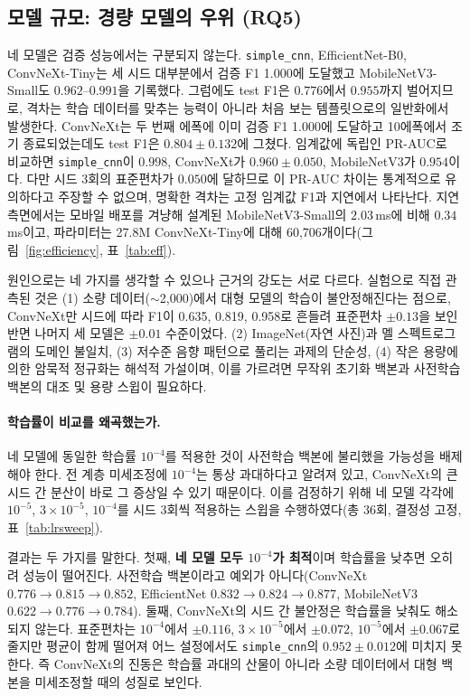 \documentclass[11pt]{article}
\renewcommand{\emph}[1]{\textbf{#1}}
\begin{document}
\subsection{모델 규모: 경량 모델의 우위 (RQ5)}
네 모델은 검증 성능에서는 구분되지 않는다. \texttt{simple\_cnn}, EfficientNet-B0,
ConvNeXt-Tiny는 세 시드 대부분에서 검증 F1 1.000에 도달했고 MobileNetV3-Small도
$0.962$--$0.991$을 기록했다. 그럼에도 test F1은 $0.776$에서 $0.955$까지 벌어지므로, 격차는
학습 데이터를 맞추는 능력이 아니라 처음 보는 템플릿으로의 일반화에서 발생한다. ConvNeXt는
두 번째 에폭에 이미 검증 F1 1.000에 도달하고 10에폭에서 조기 종료되었는데도 test F1은
$0.804\pm0.132$에 그쳤다. 임계값에 독립인 PR-AUC로 비교하면 \texttt{simple\_cnn}이 $0.998$,
ConvNeXt가 $0.960\pm0.050$, MobileNetV3가 $0.954$이다. 다만 시드 3회의 표준편차가 $0.050$에
달하므로 이 PR-AUC 차이는 통계적으로 유의하다고 주장할 수 없으며, 명확한 격차는 고정
임계값 F1과 지연에서 나타난다. 지연 측면에서는 모바일 배포를 겨냥해 설계된
MobileNetV3-Small의 $2.03$\,ms에 비해 $0.34$\,ms이고, 파라미터는 27.8M ConvNeXt-Tiny에 대해
60{,}706개이다(그림~\ref{fig:efficiency}, 표~\ref{tab:eff}).

원인으로는 네 가지를 생각할 수 있으나 근거의 강도는 서로 다르다. 실험으로 직접 관측된 것은
(1) 소량 데이터($\sim$2{,}000)에서 대형 모델의 학습이 불안정해진다는 점으로, ConvNeXt만 시드에
따라 F1이 0.635, 0.819, 0.958로 흔들려 표준편차 $\pm0.13$을 보인 반면 나머지 세 모델은
$\pm0.01$ 수준이었다. (2) ImageNet(자연 사진)과 멜 스펙트로그램의 도메인 불일치, (3) 저수준
음향 패턴으로 풀리는 과제의 단순성, (4) 작은 용량에 의한 암묵적 정규화는 해석적 가설이며,
이를 가르려면 무작위 초기화 백본과 사전학습 백본의 대조 및 용량 스윕이 필요하다.

\paragraph{학습률이 비교를 왜곡했는가.}
네 모델에 동일한 학습률 $10^{-4}$를 적용한 것이 사전학습 백본에 불리했을 가능성을 배제해야
한다. 전 계층 미세조정에 $10^{-4}$는 통상 과대하다고 알려져 있고, ConvNeXt의 큰 시드 간 분산이
바로 그 증상일 수 있기 때문이다. 이를 검정하기 위해 네 모델 각각에 $10^{-5}$, $3\times10^{-5}$,
$10^{-4}$를 시드 3회씩 적용하는 스윕을 수행하였다(총 36회, 결정성 고정, 표~\ref{tab:lrsweep}).

결과는 두 가지를 말한다. 첫째, \emph{네 모델 모두 $10^{-4}$가 최적}이며 학습률을 낮추면 오히려
성능이 떨어진다. 사전학습 백본이라고 예외가 아니다(ConvNeXt $0.776\to0.815\to0.852$,
EfficientNet $0.832\to0.824\to0.877$, MobileNetV3 $0.622\to0.776\to0.784$). 둘째, ConvNeXt의
시드 간 불안정은 학습률을 낮춰도 해소되지 않는다. 표준편차는 $10^{-4}$에서 $\pm0.116$,
$3\times10^{-5}$에서 $\pm0.072$, $10^{-5}$에서 $\pm0.067$로 줄지만 평균이 함께 떨어져 어느
설정에서도 \texttt{simple\_cnn}의 $0.952\pm0.012$에 미치지 못한다. 즉 ConvNeXt의 진동은
학습률 과대의 산물이 아니라 소량 데이터에서 대형 백본을 미세조정할 때의 성질로 보인다.
\end{document}
